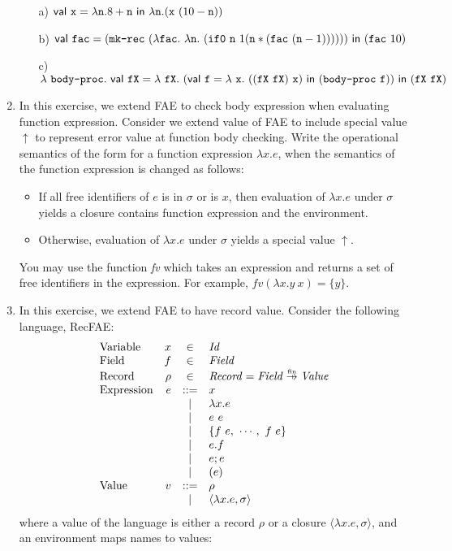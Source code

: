 \begin{enumerate}
\begin{itemize}
    \item[a)] \(\textsf{val}\ \texttt{x} = \lambda \texttt{n}. 8+\texttt{n}\ \textsf{in}\ \lambda \texttt{n}. (\texttt{x}\ (10-\texttt{n})) \)
\item[b)] \(\textsf{val}\ \code{fac} = (\code{mk-rec}\
    (\lambda \code{fac}.\ \lambda \code{n}.\ (\code{if0}\ \code{n}\ 1 (\code{n} * (\code{fac}\ (\code{n} - 1))))))\ \textsf{in}\ (\code{fac}\ 10)\)
\item[c)] \(\lambda\ \texttt{body-proc}.\
\textsf{val}\ \texttt{fX} = \lambda\ \texttt{fX}.\
(\textsf{val}\ \texttt{f} = \lambda\ \texttt{x}.\ ((\texttt{fX}\ \texttt{fX})\ \texttt{x})\
\textsf{in}\ (\texttt{body-proc}\ \texttt{f}))\
\textsf{in}\ (\texttt{fX}\ \texttt{fX}) \)
\end{itemize}

\item In this exercise, we extend FAE to check body expression when evaluating function expression.
Consider we extend value of FAE to include special value $\uparrow$ to represent error value at function body checking.
Write the operational semantics of the form
 for a function expression
$\lambda x. e$, when the semantics of the function expression
is changed as follows:
\begin{itemize}
\item If all free identifiers of $e$ is in $\sigma$ or is $x$, then evaluation of $\lambda x. e$ under $\sigma$ yields a closure
  contains function expression and the environment.
\item Otherwise, evaluation of $\lambda x. e$ under $\sigma$ yields a special value $\uparrow$.
\end{itemize}
You may use the function \textit{fv} which takes an
expression and returns a set of free identifiers in the expression.
For example, $fv(\lambda x. y\ x) = \{ y \}$.

\item In this exercise, we extend FAE to have record value. Consider the following language, RecFAE:
\[
\begin{array}{lrcl}
\text{Variable} & x & \in & \textit{Id} \\
\text{Field} & f & \in & \textit{Field} \\
\text{Record} & \rho & \in & \embox{Record} = \embox{Field} \finto \embox{Value} \\
\text{Expression}& e & ::= & x \\
&& \mid & \lambda x.e \\
&& \mid & e\ e \\
&& \mid & \{f\ e,\ \cdots,\ f\ e\}\\
&& \mid & e.f \\
&& \mid & e; e \\
&& \mid & (e) \\
\text{Value} & v & ::= & \rho \\
&& | & \langle \lambda x.e,\sigma \rangle \\
\end{array}
\]
where a value of the language is either a record $\rho$
or a closure $\langle\lambda x. e,\sigma\rangle$, and
an environment maps names to values:


\end{enumerate}
